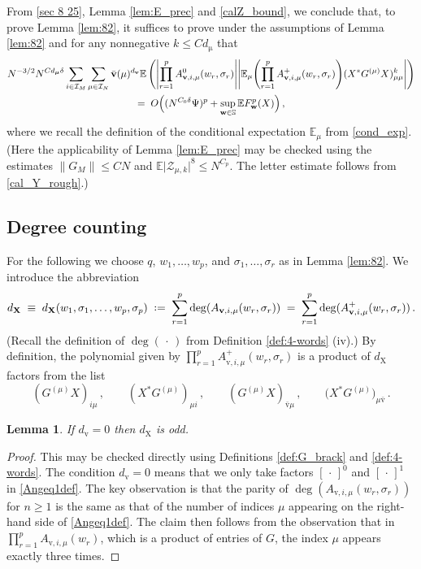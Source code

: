 \documentclass[11pt]{article} %
\numberwithin{equation}{section}
\numberwithin{figure}{section}
\theoremstyle{plain} %
\newtheorem{lemma}[theorem]{Lemma}
\theoremstyle{definition} %
\newcommand{\f}[1]{\boldsymbol{\mathrm{#1}}} %
\newcommand{\bb}{\mathbb} %
\renewcommand{\cal}{\mathcal}
\newcommand{\E}{\mathbb{E}}
\newcommand*{\deq}{\mathrel{\vcenter{\baselineskip0.65ex \lineskiplimit0pt \hbox{.}\hbox{.}}}=}
\renewcommand{\leq}{\leqslant}
\renewcommand{\geq}{\geqslant}
\newcommand{\p}[1]{({#1})}
\newcommand{\pb}[1]{\bigl({#1}\bigr)}
\newcommand{\pB}[1]{\Bigl({#1}\Bigr)}
\newcommand{\pBB}[1]{\Biggl({#1}\Biggr)}
\newcommand{\pa}[1]{\left({#1}\right)}
\newcommand{\abs}[1]{\lvert #1 \rvert}
\newcommand{\absBB}[1]{\Biggl\lvert #1 \Biggr\rvert}
\newcommand{\norm}[1]{\lVert #1 \rVert}
\begin{document}
From \eqref{sec 8 25}, Lemma \ref{lem:E_prec} and \eqref{calZ_bound}, we conclude that, to prove Lemma \ref{lem:82}, it suffices to prove under the assumptions of Lemma \ref{lem:82} and for any nonnegative $k \leq C d_{\f \mu}$ that
\begin{multline} \label{sec8 3}
N^{-3/2} N^{C d_{\f \mu} \delta} \sum_{i \in \cal I_M} \sum_{\mu \in \cal I_N} \bar{\f v}(\mu)^{d_{\f v}} \E \pa{\absBB{\prod_{r = 1}^{p} A_{\f v,i,\mu}^0(w_r, \sigma_r)} \absBB {\E_\mu \pBB{\prod_{r = 1}^{p} A_{\f v,i,\mu}^+(w_r, \sigma_r)} (X^* G^{(\mu)} X)_{\mu \mu}^k}}
\\
=\; O \pB{(N^{C_0 \delta}\Psi)^p+\sup_{\f w \in \bb S} \E F^p_{\f w}(X)}\,,
\end{multline}
where we recall the definition of the conditional expectation $\E_\mu$ from \eqref{cond_exp}.
(Here the applicability of Lemma \ref{lem:E_prec} may be checked using the estimates $\norm{G_M} \leq CN$ and $\E \abs{\cal Z_{\mu,k}}^8 \leq N^{C_p}$. The letter estimate follows from \eqref{cal_Y_rough}.)





\subsection{Degree counting}

For the following we choose $q$, $w_1, \dots, w_p$, and $\sigma_1, \dots, \sigma_r$ as in Lemma \ref{lem:82}. We introduce the abbreviation
\begin{equation} \label{def_d_X}
d_{\f X} \;\equiv\; d_{\f X}(w_1, \sigma_1, \dots, w_p, \sigma_p) \;\deq\; \sum_{r = 1}^p \deg (A_{\f v,i,\mu}(w_r,\sigma_r)) \;=\; \sum_{r = 1}^p \deg (A_{\f v,i,\mu}^+(w_r,\sigma_r))\,.
\end{equation}
(Recall the definition of $\deg (\,\cdot\,)$ from Definition \ref{def:4-words} (iv).)
By definition, the polynomial given by $\prod_{r = 1}^p A_{\f v,i,\mu}^+(w_r, \sigma_r)$ is a product of $d_{\f X}$ factors from the list
\begin{equation} \label{A1_form2}
(G^{(\mu)} X)_{i \mu}\,, \qquad (X^* G^{(\mu)})_{\mu i} \,, \qquad \p{G^{(\mu)} X}_{\bar{\f v} \mu}\,, \qquad \pb{X^* G^{(\mu)}}_{\mu \bar {\f v}}\,.
\end{equation}


\begin{lemma} \label{lem:d odd}
If $d_{\f v} = 0$ then $d_{\f X}$ is odd.
\end{lemma}
\begin{proof}
This may be checked directly using Definitions \ref{def:G_brack} and \ref{def:4-words}. The condition $d_{\f v} = 0$ means that we only take factors $[\,\cdot\,]^0$ and $[\,\cdot\,]^1$ in \eqref{Angeq1def}. The key observation is that the parity of $\deg (A_{\f v,i,\mu}(w_r,\sigma_r))$ for $n \geq 1$ is the same as that of the number of indices $\mu$ appearing on the right-hand side of \eqref{Angeq1def}. The claim then follows from the observation that in $\prod_{r = 1}^p A_{\f v,i,\mu}(w_r)$, which is a product of entries of $G$, the index $\mu$ appears exactly three times.
\end{proof}
\end{document}
